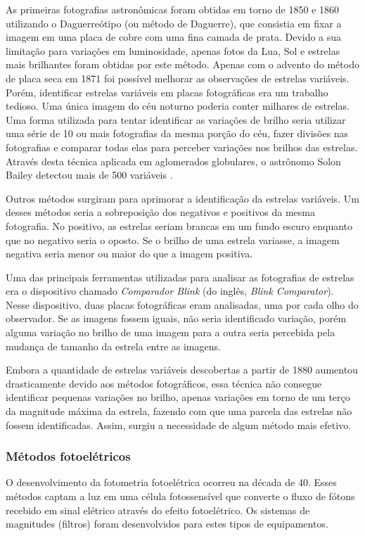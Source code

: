 As primeiras fotografias astronômicas foram obtidas em torno de 1850 e 1860 utilizando o Daguerreótipo (ou método de Daguerre), que consistia em fixar a imagem em uma placa de cobre com uma fina camada de prata. Devido a sua limitação para variações em luminosidade, apenas fotos da Lua, Sol e estrelas mais brilhantes foram obtidas por este método. Apenas com o advento do método de placa seca em 1871 foi possível melhorar as observações de estrelas variáveis. Porém, identificar estrelas variáveis em placas fotográficas era um trabalho tedioso. Uma única imagem do céu noturno poderia conter milhares de estrelas. Uma forma utilizada para tentar identificar as variações de brilho seria utilizar uma série de 10 ou mais fotografias da mesma porção do céu, fazer divisões nas fotografias e comparar todas elas para perceber variações nos brilhos das estrelas. Através desta técnica aplicada em aglomerados globulares, o astrônomo Solon Bailey detectou mais de 500 variáveis \citep{Bailey1902}.

Outros métodos surgiram para aprimorar a identificação da estrelas variáveis. Um desses métodos seria a sobreposição dos negativos e positivos da mesma fotografia. No positivo, as estrelas seriam brancas em um fundo escuro enquanto que no negativo seria o oposto. Se o brilho de uma estrela variasse, a imagem negativa seria menor ou maior do que a imagem positiva.

Uma das principais ferramentas utilizadas para analisar as fotografias de estrelas era o dispositivo chamado \textit{Comparador Blink} (do inglês, \textit{Blink Comparator}). Nesse dispositivo, duas placas fotográficas eram analisadas, uma por cada olho do observador. Se as imagens fossem iguais, não seria identificado variação, porém alguma variação no brilho de uma imagem para a outra seria percebida pela mudança de tamanho da estrela entre as imagens.

Embora a quantidade de estrelas variáveis descobertas a partir de 1880 aumentou drasticamente devido aos métodos fotográficos, essa técnica não consegue identificar pequenas variações no brilho, apenas variações em torno de um terço da magnitude máxima da estrela, fazendo com que uma parcela das estrelas não fossem identificadas. Assim, surgiu a necessidade de algum método mais efetivo.


\subsubsection{Métodos fotoelétricos}
O desenvolvimento da fotometria fotoelétrica ocorreu na década de 40. Esses métodos captam a luz em uma célula fotossensível que converte o fluxo de fótons recebido em sinal elétrico através do efeito fotoelétrico. Os sistemas de magnitudes (filtros) foram desenvolvidos para estes tipos de equipamentos.

